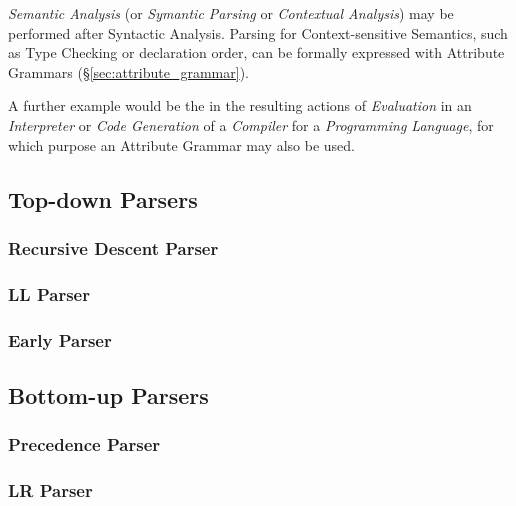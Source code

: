 \emph{Semantic Analysis} (or \emph{Symantic Parsing} or
\emph{Contextual Analysis}) may be performed after Syntactic Analysis.
Parsing for Context-sensitive Semantics, such as Type Checking or
declaration order, can be formally expressed with Attribute Grammars
(\S\ref{sec:attribute_grammar}).

A further example would be the in the resulting actions of
\emph{Evaluation} in an \emph{Interpreter} or \emph{Code Generation}
of a \emph{Compiler} for a \emph{Programming Language}, for which
purpose an Attribute Grammar may also be used.



\subsection{Top-down Parsers}

\subsubsection{Recursive Descent Parser}

\subsubsection{LL Parser}

\subsubsection{Early Parser}



\subsection{Bottom-up Parsers}

\subsubsection{Precedence Parser}

\subsubsection{LR Parser}


